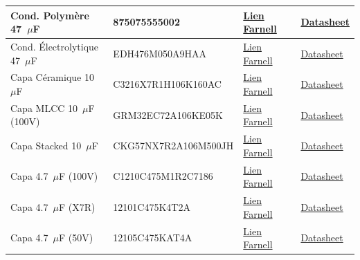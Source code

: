\begin{tableau}[H]
{\begin{tabular}{|l|l|l|l|}
        \hline
        Cond. Polymère 47~$\mu$F & 875075555002 & \href{https://fr.farnell.com/wurth-elektronik/875075555002/cond-47uf-25v-alu-elec-polymer/dp/4257162}{Lien Farnell} & \href{https://www.google.com/search?q=https://octopart.com/search\%3Fq\%3D875075555002}{Datasheet} \\
        \hline
        Cond. Électrolytique 47~$\mu$F & EDH476M050A9HAA & \href{https://fr.farnell.com/kemet/edh476m050a9haa/cap-47uf-50v-alu-elec-smd/dp/3346120}{Lien Farnell} & \href{https://www.google.com/search?q=https://octopart.com/search\%3Fq\%3DEDH476M050A9HAA}{Datasheet} \\
        \hline
        Capa Céramique 10~$\mu$F & C3216X7R1H106K160AC & \href{https://fr.farnell.com/tdk/c3216x7r1h106k160ac/condensateur-10uf-50v-mlcc-1206/dp/3416233}{Lien Farnell} & \href{https://www.google.com/search?q=https://octopart.com/search\%3Fq\%3DC3216X7R1H106K160AC}{Datasheet} \\
        \hline
        Capa MLCC 10~$\mu$F (100V) & GRM32EC72A106KE05K & \href{https://fr.farnell.com/murata/grm32ec72a106ke05k/cap-10uf-100v-mlcc-1210/dp/3581425}{Lien Farnell} & \href{https://www.google.com/search?q=https://octopart.com/search\%3Fq\%3DGRM32EC72A106KE05K}{Datasheet} \\
        \hline
        Capa Stacked 10~$\mu$F & CKG57NX7R2A106M500JH & \href{https://fr.farnell.com/en-FR/tdk/ckg57nx7r2a106m500jh/cap-10uf-100v-mlcc-stacked-2220/dp/1886985}{Lien Farnell} & \href{https://www.google.com/search?q=https://octopart.com/search\%3Fq\%3DCKG57NX7R2A106M500JH}{Datasheet} \\
        \hline
        Capa 4.7~$\mu$F (100V) & C1210C475M1R2C7186 & \href{https://fr.farnell.com/kemet/c1210c475m1r2c7186/cond-4-7-f-100v-20-x7r-1210/dp/1826342}{Lien Farnell} & \href{https://www.google.com/search?q=https://octopart.com/search\%3Fq\%3DC1210C475M1R2C7186}{Datasheet} \\
        \hline
        Capa 4.7~$\mu$F (X7R) & 12101C475K4T2A & \href{https://fr.farnell.com/avx/12101c475k4t2a/cond-4-7-f-100v-10-x7r-1210/dp/2834945}{Lien Farnell} & \href{https://www.google.com/search?q=https://octopart.com/search\%3Fq\%3D12101C475K4T2A}{Datasheet} \\
        \hline
        Capa 4.7~$\mu$F (50V) & 12105C475KAT4A & \href{https://fr.farnell.com/kyocera-avx/12105c475kat4a/cap-mlcc-x7r-4-7uf-50v-1210/dp/3906633}{Lien Farnell} & \href{https://www.google.com/search?q=https://octopart.com/search\%3Fq\%3D12105C475KAT4A}{Datasheet} \\

\end{tabular}}
\end{tableau}
